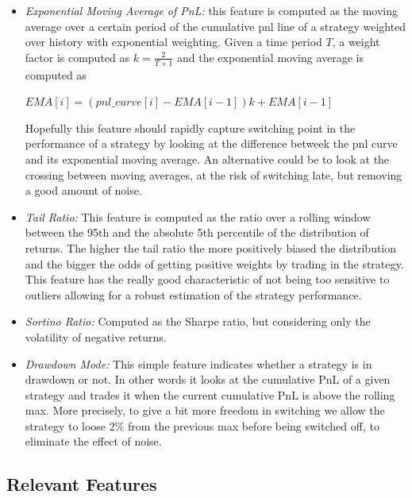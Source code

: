 \documentclass[a4paper]{article}
\begin{document}
\begin{itemize}
	\item \textit{Exponential Moving Average of PnL:} this feature is computed as the moving average over a certain period of the cumulative pnl line of a strategy weighted over history with exponential weighting. Given a time period $T$, a weight factor is computed as $k = \frac{2}{T+1}$ and the exponential moving average is computed as\\
	
	\begin{center} 
		$\displaystyle EMA[i] =  \left(pnl\_curve[i] - EMA[i-1]\right)k + EMA[i-1]$
	\end{center}
	
	Hopefully this feature should rapidly capture switching point in the performance of a strategy by looking at the difference betweek the pnl curve and its exponential moving average. An alternative could be to look at the crossing between moving averages, at the risk of switching late, but removing a good amount of noise.\\
	
	\item \textit{Tail Ratio:} This feature is computed as the ratio over a rolling window between the 95th and the absolute 5th percentile of the distribution of returns. The higher the tail ratio the more positively biased the distribution and the bigger the odds of getting positive weights by trading in the strategy. This feature has the really good characteristic of not being too sensitive to outliers allowing for a robust estimation of the strategy performance.\\
	
	\item \textit{Sortino Ratio:} Computed as the Sharpe ratio, but considering only the volatility of negative returns.\\ 
	
	\item \textit{Drawdown Mode:} This simple feature indicates whether a strategy is in drawdown or not. In other words it looks at the cumulative PnL of a given strategy and trades it when the current cumulative PnL is above the rolling max. More precisely, to give a bit more freedom in switching we allow the strategy to loose 2\% from the previous max before being switched off, to eliminate the effect of noise.\\
	 
\end{itemize}


\subsection*{Relevant Features}
\end{document}
